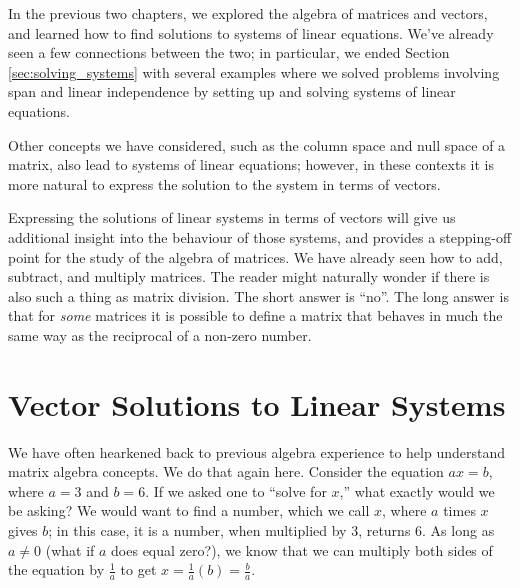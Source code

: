 
In the previous two chapters, we explored the algebra of matrices and vectors, and learned how to find solutions to systems of linear equations. We've already seen a few connections between the two; in particular, we ended Section \ref{sec:solving_systems} with several examples where we solved problems involving span and linear independence by setting up and solving systems of linear equations.

Other concepts we have considered, such as the column space and null space of a matrix, also lead to systems of linear equations; however, in these contexts it is more natural to express the solution to the system in terms of vectors. 

Expressing the solutions of linear systems in terms of vectors will give us additional insight into the behaviour of those systems, and provides a stepping-off point for the study of the algebra of matrices. We have already seen how to add, subtract, and multiply matrices. The reader might naturally wonder if there is also such a thing as matrix division. The short answer is ``no''. The long answer is that for \textit{some} matrices it is possible to define a matrix  that behaves in much the same way as the reciprocal of a non-zero number.

\section{Vector Solutions to Linear Systems}\label{sec:vector_solutions}



We have often hearkened back to previous algebra experience to help understand matrix algebra concepts. We do that again here. Consider the equation $ax=b$, where $a=3$ and $b=6$. If we asked one to ``solve for $x$,'' what exactly would we be asking? We would want to find a number, which we call $x$, where $a$ times $x$ gives $b$; in this case, it is a number, when multiplied by 3, returns 6. As long as $a\neq 0$ (what if $a$ does equal zero?), we know that we can multiply both sides of the equation by $\frac{1}{a}$ to get $x = \frac{1}{a}(b) = \frac{b}{a}$.

